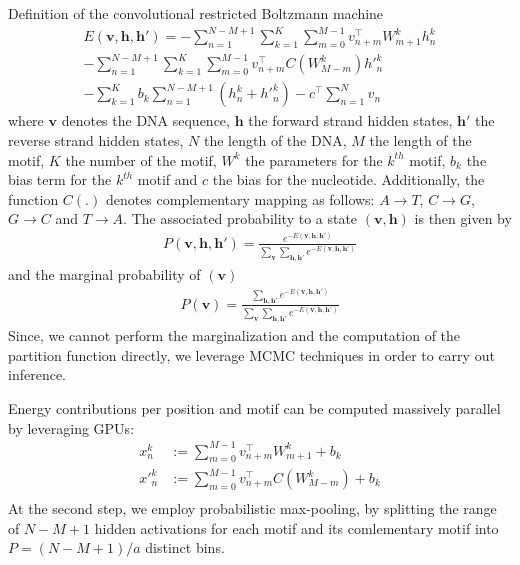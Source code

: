 \documentclass[12pt]{article}
\begin{document}
Definition of the convolutional restricted Boltzmann machine
\begin{align}
	E(\mathbf{v},\mathbf{h}, \mathbf{h}')=
	-\sum_{n=1}^{N-M+1}\sum_{k=1}^K\sum_{m=0}^{M-1} v_{n+m}^\top W_{m+1}^k h_n^k \nonumber\\
	-\sum_{n=1}^{N-M+1}\sum_{k=1}^K\sum_{m=0}^{M-1} v_{n+m}^\top C(W_{M-m}^k) {h'}_n^k\nonumber\\
	- \sum_{k=1}^K b_k \sum_{n=1}^{N-M+1}(h_n^k + {h'}_n^k)
	-c^\top \sum_{n=1}^{N}v_n
\end{align}
where $\mathbf{v}$ denotes the DNA sequence, $\mathbf{h}$ the forward strand 
hidden states, $\mathbf{h}'$ the reverse strand
hidden states, $N$ the length of the DNA, $M$ the length of the motif, 
$K$ the number of the motif, $W^k$ the parameters for the $k^{th}$ motif,
$b_k$ the bias term for the $k^{th}$ motif and $c$ the bias for the
nucleotide. Additionally, the function $C(.)$ denotes complementary mapping
as follows: $A\rightarrow T$, 
$C\rightarrow G$, $G\rightarrow C$ and $T\rightarrow A$.
The associated probability to a state $(\mathbf{v},\mathbf{h})$ is then given
by
\begin{align}
	P(\mathbf{v},\mathbf{h}, \mathbf{h}')=\frac{e^{-E(\mathbf{v},\mathbf{h},\mathbf{h}')}}
	{\sum_{\mathbf{v}}\sum_{\mathbf{h}, \mathbf{h}'}e^{-E(\mathbf{v},\mathbf{h},\mathbf{h}')}}
\end{align}
and the marginal probability of $(\mathbf{v})$
\begin{align}
	P(\mathbf{v})=\frac{\sum_{\mathbf{h}, \mathbf{h}'}e^{-E(\mathbf{v},\mathbf{h},\mathbf{h}')}}
	{\sum_{\mathbf{v}}\sum_{\mathbf{h},\mathbf{h}'}e^{-E(\mathbf{v},\mathbf{h},\mathbf{h}')}}
\end{align}
Since, we cannot perform the marginalization and the computation of the
partition function directly, we leverage MCMC techniques in order
to carry out inference.\par
Energy contributions per position and motif can be computed massively parallel
by leveraging GPUs:
\begin{align}
	x_n^k&:=\sum_{m=0}^{M-1}v_{n+m}^\top W_{m+1}^k + b_k\\
	{x'}_n^k&:=\sum_{m=0}^{M-1}v_{n+m}^\top C(W_{M-m}^k) + b_k\\
\end{align}
At the second step, we employ probabilistic max-pooling, 
by splitting the range of $N-M+1$ hidden activations for
each motif and its comlementary motif into $P=(N-M+1)/a$ distinct bins.
\end{document}
